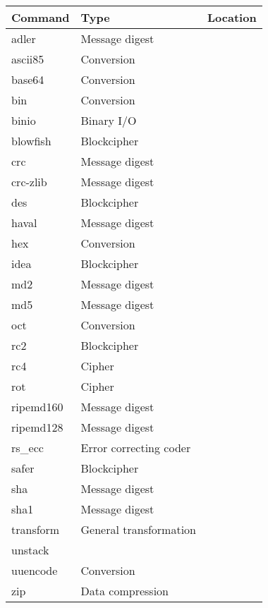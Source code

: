 \documentclass {report}
\begin{document}
\begin {center}
\begin {tabular}{|l|l|l|}\hline
	Command		& Type				& Location \\ \hline\hline
	adler		& Message digest		& \zlib	\\ \hline
	ascii85		& Conversion			& \trf	\\ \hline
	base64		& Conversion			& \trf	\\ \hline
	bin		& Conversion			& \trf	\\ \hline
	binio		& Binary I/O			& \trf	\\ \hline
	blowfish	& Blockcipher			& \trf	\\ \hline
	crc		& Message digest		& \trf	\\ \hline
	crc-zlib	& Message digest		& \zlib	\\ \hline
	des		& Blockcipher			& \SSLeay \\ \hline
	haval		& Message digest		& \trf	\\ \hline
	hex		& Conversion			& \trf	\\ \hline
	idea		& Blockcipher			& \trf	\\ \hline
	md2		& Message digest		& \SSLeay \\ \hline
	md5		& Message digest		& \trf	\\ \hline
	oct		& Conversion			& \trf	\\ \hline
	rc2		& Blockcipher			& \SSLeay \\ \hline
	rc4		& Cipher			& \trf	\\ \hline
	rot		& Cipher			& \trf	\\ \hline
	ripemd160	& Message digest		& \trf	\\ \hline
	ripemd128	& Message digest		& \trf	\\ \hline
	rs\_ecc		& Error correcting coder	& \trf	\\ \hline
	safer		& Blockcipher			& \trf	\\ \hline
	sha		& Message digest		& \trf	\\ \hline
	sha1		& Message digest		& \SSLeay \\ \hline
	transform	& General transformation	& \trf	\\ \hline
	unstack		&				& \trf	\\ \hline
	uuencode	& Conversion			& \trf	\\ \hline
	zip		& Data compression		& \zlib	\\ \hline
\end {tabular}
\end {center}
\end{document}
